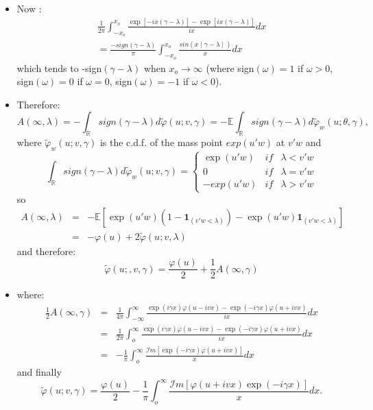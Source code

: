 \documentclass[
  12pt,
]{book}
\theoremstyle{definition}
\theoremstyle{definition}
\theoremstyle{definition}
\theoremstyle{definition}
\theoremstyle{remark}
\begin{document}
\begin{itemize}
\item
  Now :
  \begin{eqnarray*}
  \displaystyle \frac{1}{2\pi} \int^{x_o}_{-x_o}
  \displaystyle \frac{\exp[-ix(\gamma-\lambda)]
  -\exp[ix(\gamma-\lambda)]}{ix}dx \\ = \displaystyle \frac{-sign(\gamma-\lambda)}{\pi}
  \int^{x_o}_{-x_o}\displaystyle \frac{sin(x\mid\gamma-\lambda\mid)}{x}dx
  \end{eqnarray*}
  which tends to -sign\((\gamma-\lambda)\) when \(x_o\rightarrow\infty\) (where sign\((\omega)=1\) if \(\omega>0\), sign\((\omega)=0\) if \(\omega=0\), sign\((\omega)=-1\) if \(\omega<0\)).
\item
  Therefore:
  \[
  A(\infty,\lambda) = - \displaystyle \int_{\mathbb{R}} sign(\gamma-\lambda)d\tilde{\varphi}(u;v,\gamma) = -\mathbb{E} \displaystyle \int_{\mathbb{R}} sign(\gamma-\lambda)d\tilde{\varphi}_w(u;\theta,\gamma),
  \]
  where \(\tilde{\varphi}_w(u;v,\gamma)\) is the c.d.f. of the mass point \(exp(u'w)\) at \(v'w\) and
  \[
  \displaystyle \int_{\mathbb{R}} sign(\gamma-\lambda)d\tilde{\varphi}_w(u;v,\gamma)=
  \left\{
  \begin{array}{ccl}
   \exp(u'w) & if& \lambda<v'w \\
       0 & if& \lambda=v'w \\
      - exp(u'w) & if& \lambda>v'w
      \end{array}
      \right.
  \]
  so
  \begin{eqnarray*}
  A(\infty,\lambda) & =& - \mathbb{E}[\exp(u'w)(1-\textbf{1}_{(v'w<\lambda)})-\exp(u'w)\textbf{1}_{(v'w<\lambda)}] \\
  & =& - \varphi(u) + 2\tilde{\varphi}(u;v,\lambda)
  \end{eqnarray*}
  and therefore:
  \[
  \tilde{\varphi}(u;,v,\gamma) = \displaystyle \frac{\varphi(u)}{2} + \displaystyle \frac{1}{2} A(\infty,\gamma)
  \]
\item
  where:
  \begin{eqnarray*}
  \displaystyle \frac{1}{2} A(\infty,\gamma) & =& \displaystyle \frac{1}{4\pi} \int^{\infty}_{-\infty} \displaystyle \frac{\exp(i\gamma x)\varphi(u-ivx)-\exp(-i\gamma x)\varphi(u+ivx)}{ix} dx \\
  & =& \displaystyle \frac{1}{2\pi} \int^{\infty}_{o} \displaystyle \frac{\exp(i\gamma x)\varphi(u-ivx)-\exp(-i\gamma x)\varphi(u+ivx)}{ix} dx \\
  & =& - \displaystyle \frac{1}{\pi} \int^{\infty}_{o} \displaystyle \frac{{\mathcal I}m[\exp(-i\gamma x)\varphi(u+ivx)]}{x}dx
  \end{eqnarray*}
  and finally
  \[
  \tilde{\varphi}(u;v,\gamma) = \displaystyle \frac{\varphi(u)}{2} - \displaystyle \frac{1}{\pi} \int^\infty_o
  \displaystyle \frac{{\mathcal I}m[\varphi(u+ivx)\exp(-i\gamma x)]}{x}dx.
  \]
\end{itemize}
\end{document}
